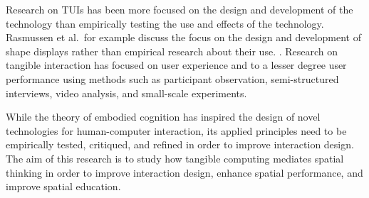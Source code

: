 \documentclass{sigchi}
\begin{document}

Research on TUIs has been more focused on the 
design and development of the technology 
than empirically testing the use and effects of the technology.
Rasmussen et al.\ for example discuss 
the focus on the design and development of shape displays 
rather than empirical research about their use. 
\cite{Rasmussen2012}.
Research on tangible interaction has focused on user experience 
and to a lesser degree user performance 
using methods such as
participant observation, 
semi-structured interviews,
video analysis,
and small-scale experiments. 

While the theory of embodied cognition
has inspired the design of novel technologies 
for human-computer interaction,
its applied principles need to be empirically tested, 
critiqued, and refined in order to improve interaction design.  
The aim of this research is to study how tangible computing 
mediates spatial thinking in order to 
improve interaction design, enhance spatial performance, 
and improve spatial education. 
\end{document}

